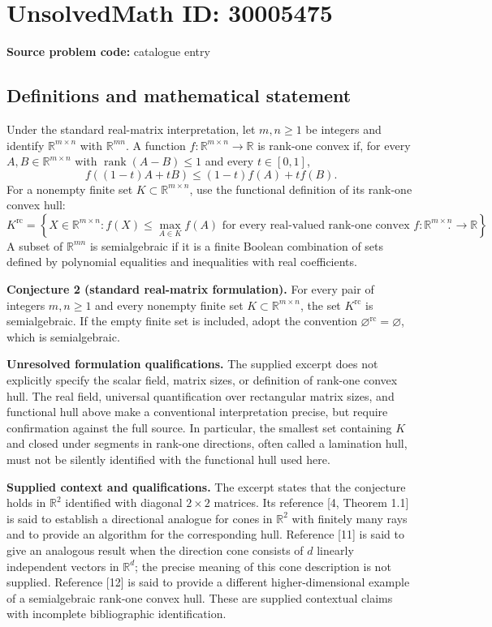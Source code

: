 \documentclass[11pt]{article}
\newcommand{\R}{\mathbb{R}}
\begin{document}
\section*{UnsolvedMath ID: 30005475}
\textbf{Source problem code:} catalogue entry
\subsection{Definitions and mathematical statement}
Under the standard real-matrix interpretation, let \(m,n\geq 1\) be integers and identify \(\R^{m\times n}\) with \(\R^{mn}\). A function \(f:\R^{m\times n}\to\R\) is rank-one convex if, for every \(A,B\in\R^{m\times n}\) with \(\operatorname{rank}(A-B)\leq 1\) and every \(t\in[0,1]\),
\[
f((1-t)A+tB)\leq (1-t)f(A)+tf(B).
\]
For a nonempty finite set \(K\subset\R^{m\times n}\), use the functional definition of its rank-one convex hull:
\[
K^{\mathrm{rc}}=\left\{X\in\R^{m\times n}: f(X)\leq\max_{A\in K}f(A)\text{ for every real-valued rank-one convex }f:\R^{m\times n}\to\R\right\}.
\]
A subset of \(\R^{mn}\) is semialgebraic if it is a finite Boolean combination of sets defined by polynomial equalities and inequalities with real coefficients.

\textbf{Conjecture 2 (standard real-matrix formulation).} For every pair of integers \(m,n\geq1\) and every nonempty finite set \(K\subset\R^{m\times n}\), the set \(K^{\mathrm{rc}}\) is semialgebraic. If the empty finite set is included, adopt the convention \(\varnothing^{\mathrm{rc}}=\varnothing\), which is semialgebraic.

\textbf{Unresolved formulation qualifications.} The supplied excerpt does not explicitly specify the scalar field, matrix sizes, or definition of rank-one convex hull. The real field, universal quantification over rectangular matrix sizes, and functional hull above make a conventional interpretation precise, but require confirmation against the full source. In particular, the smallest set containing \(K\) and closed under segments in rank-one directions, often called a lamination hull, must not be silently identified with the functional hull used here.

\textbf{Supplied context and qualifications.} The excerpt states that the conjecture holds in \(\R^2\) identified with diagonal \(2\times2\) matrices. Its reference [4, Theorem 1.1] is said to establish a directional analogue for cones in \(\R^2\) with finitely many rays and to provide an algorithm for the corresponding hull. Reference [11] is said to give an analogous result when the direction cone consists of \(d\) linearly independent vectors in \(\R^d\); the precise meaning of this cone description is not supplied. Reference [12] is said to provide a different higher-dimensional example of a semialgebraic rank-one convex hull. These are supplied contextual claims with incomplete bibliographic identification.
\end{document}
